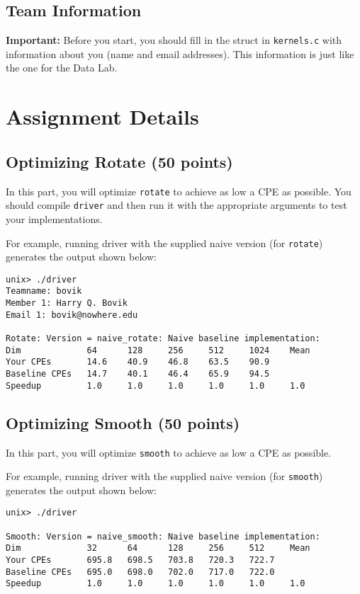 \documentclass[11pt]{article}
\begin{document}
\subsection*{Team Information}
{\bf Important:} Before you start, you should fill in the struct in
{\tt kernels.c} with information about you (name and email addresses).
This information is just like the one for the Data Lab.

\section{Assignment Details}

\subsection*{Optimizing Rotate (50 points)}
In this part, you will optimize {\tt rotate} to achieve as low a CPE
as possible.  You should compile {\tt driver} and then run it with the
appropriate arguments to test your implementations.

For example, running driver with the supplied naive version (for
{\tt rotate}) generates the output shown below:
\small{\begin{verbatim}
unix> ./driver
Teamname: bovik
Member 1: Harry Q. Bovik
Email 1: bovik@nowhere.edu

Rotate: Version = naive_rotate: Naive baseline implementation:
Dim             64      128     256     512     1024    Mean
Your CPEs       14.6    40.9    46.8    63.5    90.9
Baseline CPEs   14.7    40.1    46.4    65.9    94.5
Speedup         1.0     1.0     1.0     1.0     1.0     1.0
\end{verbatim}}

\subsection*{Optimizing Smooth (50 points)}
In this part, you will optimize {\tt smooth} to achieve as low a CPE
as possible.

For example, running driver with the supplied naive version (for
{\tt smooth}) generates the output shown below:
\small{\begin{verbatim}
unix> ./driver

Smooth: Version = naive_smooth: Naive baseline implementation:
Dim             32      64      128     256     512     Mean
Your CPEs       695.8   698.5   703.8   720.3   722.7
Baseline CPEs   695.0   698.0   702.0   717.0   722.0
Speedup         1.0     1.0     1.0     1.0     1.0     1.0
\end{verbatim}}
\end{document}
